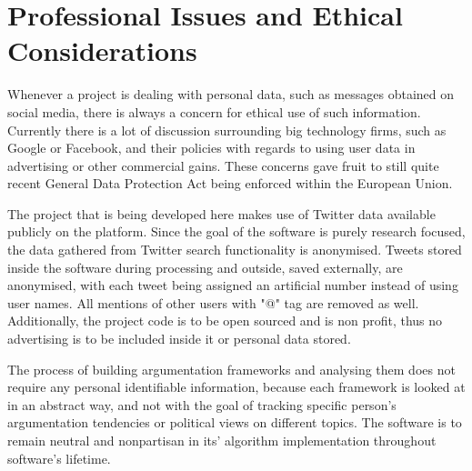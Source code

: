 \section{Professional Issues and Ethical Considerations}
    Whenever a project is dealing with personal data, such as messages obtained on social media, there is always a concern for ethical use of such information. Currently there is a lot of discussion surrounding big technology firms, such as Google or Facebook, and their policies with regards to using user data in advertising or other commercial gains. These concerns gave fruit to still quite recent General Data Protection Act being enforced within the European Union.
    
    The project that is being developed here makes use of Twitter data available publicly on the platform. Since the goal of the software is purely research focused, the data gathered from Twitter search functionality is anonymised. Tweets stored inside the software during processing and outside, saved externally, are anonymised, with each tweet being assigned an artificial number instead of using user names. All mentions of other users with "@" tag are removed as well. Additionally, the project code is to be open sourced and is non profit, thus no advertising is to be included inside it or personal data stored.
    
    The process of building argumentation frameworks and analysing them does not require any personal identifiable information, because each framework is looked at in an abstract way, and not with the goal of tracking specific person's argumentation tendencies or political views on different topics. The software is to remain neutral and nonpartisan in its' algorithm implementation throughout software's lifetime.